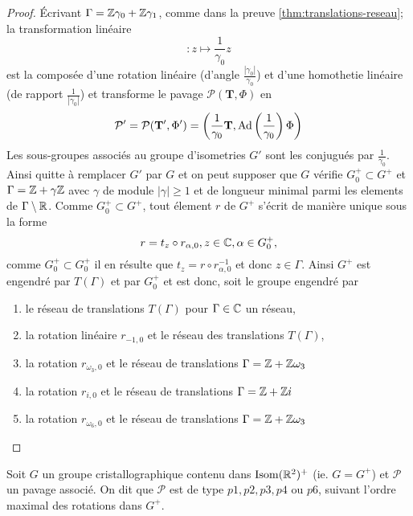 \begin{proof}
	Écrivant $\Gamma = \mathbb{Z}\gamma_0 +\mathbb{Z}\gamma_1$, comme dans la preuve
	\ref{thm:translations-reseau};
	la transformation linéaire
	\begin{equation}
		[\times \frac{1}{\gamma_0}]: z \mapsto \frac{1}{\gamma_0} z
	\end{equation}
	est la composée d'une rotation linéaire (d'angle
	$\frac{|\gamma_0|}{\gamma_0}$) et d'une homothetie linéaire (de rapport 
	$\frac{1}{|\gamma_0|}$) et transforme le pavage
	$\mathcal{P}(\mathbf{T}, \Phi)$ en
	\begin{equation*}
		\mathcal{P}' = \mathcal{P}(\mathbf{T}', \Phi') =
		\left(\frac{1}{\gamma_0}\mathbf{T},
		\operatorname{Ad}\left(\frac{1}{\gamma_0}\right)\Phi\right)
	\end{equation*}
	Les sous-groupes associés au groupe d'isometries $G'$ sont les conjugués par
	$\frac{1}{\gamma_0}$. Ainsi quitte à remplacer $G'$ par $G$ et on peut
	supposer que $G$ vérifie $G_0^+ \subset G^+$ et $\Gamma=\mathbb{Z} + \gamma\mathbb{Z}$ avec
	$\gamma$ de module $|\gamma| \geq 1$ et de longueur minimal parmi les
	elements de $\Gamma \setminus \mathbb{R}$. Comme $G_0^+ \subset G^+$, tout élement
	$r$ de $G^+$ s'écrit de manière unique sous la forme
	\begin{equation*}
		r = t_z \circ r_{\alpha, 0}, z\in\mathbb{C}, \alpha \in G_0^+,
	\end{equation*}
	comme $G_0^+ \subset G_0^+$ il en résulte que
	$t_z = r \circ r_{\alpha, 0}^{-1}$ et donc $z \in \Gamma$.
	Ainsi $G^+$ est engendré par $T(\Gamma)$ et par $G_0^+$ et est donc, soit le
	groupe engendré par
	\begin{enumerate}
		\item le réseau de translations $T(\Gamma)$ pour $\Gamma \in \mathbb{C}$ un
			réseau,
		\item la rotation linéaire $r_{-1, 0}$ et le
			réseau des translations $T(\Gamma)$,
		\item la rotation $r_{\omega_3, 0}$ et le réseau de translations
			$\Gamma = \mathbb{Z} + \mathbb{Z}\omega_3$
		\item la rotation $r_{i, 0}$ et le réseau de translations
			$\Gamma = \mathbb{Z} + \mathbb{Z} i$
		\item la rotation $r_{\omega_6, 0}$ et le réseau de translations
			$\Gamma = \mathbb{Z} + \mathbb{Z}\omega_3$
	\end{enumerate}
\end{proof}

\begin{definition}
	Soit $G$ un groupe cristallographique contenu dans $\operatorname{Isom}(\mathbb{R}^2)^+$
	(ie. $G = G^+$) et $\mathcal{P}$ un pavage associé.
	On dit que $\mathcal{P}$ est de type $p1, p2, p3, p4$ ou $p6$, suivant
	l'ordre maximal des rotations dans $G^+$.
\end{definition}



